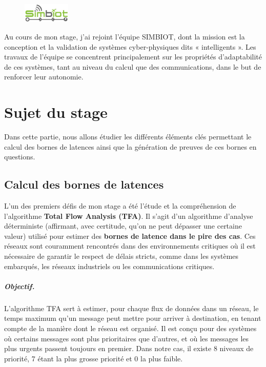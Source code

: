 \documentclass[12pt]{report}
\begin{document}
\vspace{1cm}

\begin{figure}
    \vspace{-3pt}
    \includegraphics[width=0.20\textwidth]{logo_simbiot.png}
    \vspace{-3pt}
\end{figure}

Au cours de mon stage, j'ai rejoint l'équipe SIMBIOT, dont la mission est la conception et la validation de systèmes cyber-physiques dits « intelligents ». 
Les travaux de l'équipe se concentrent principalement sur les propriétés d'adaptabilité de ces systèmes, tant au niveau du calcul que des communications, dans le but de renforcer leur autonomie.


\chapter{Sujet du stage}

Dans cette partie, nous allons étudier les différents éléments clés permettant
le calcul des bornes de latences ainsi que la génération de preuves de ces bornes
en questions.

\section*{Calcul des bornes de latences}

L'un des premiers défis de mon stage a été l'étude et la compréhension de l'algorithme 
\textbf{Total Flow Analysis (TFA)}. Il s'agit d'un algorithme d'analyse déterministe
(affirmant, avec certitude, qu'on ne peut dépasser une certaine valeur) utilisé pour estimer des \textbf{bornes de latence dans le pire des cas}. Ces réseaux sont couramment rencontrés dans des environnements critiques où il est nécessaire de garantir le respect de délais stricts, comme dans les systèmes embarqués, les réseaux industriels ou les communications critiques.

\paragraph{Objectif.} L'algorithme TFA sert à estimer, pour chaque flux de données dans un réseau, le temps maximum qu'un message peut mettre pour arriver à destination, en tenant compte de la manière dont le réseau est organisé. Il est conçu pour des systèmes où certains messages sont plus prioritaires que d'autres, et où les messages les plus urgents passent toujours en premier. Dans notre cas, il existe 8 niveaux de priorité, 7 étant la plus grosse priorité et 0 la plus faible.
\end{document}
